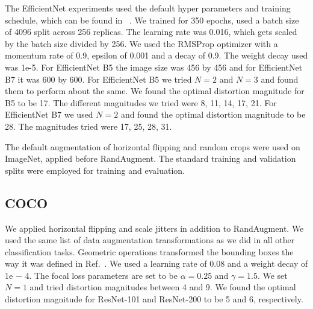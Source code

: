 The EfficientNet experiments used the default hyper parameters and training schedule, which can be found in ~\cite{tan2019efficientnet}. We trained for 350 epochs, used a batch size of 4096 split across 256 replicas. The learning rate was 0.016, which gets scaled by the batch size divided by 256. We used the RMSProp optimizer with a momentum rate of 0.9, epsilon of 0.001 and a decay of 0.9. The weight decay used was 1e-5. For EfficientNet B5 the image size was 456 by 456 and for EfficientNet B7 it was 600 by 600. For EfficientNet B5 we tried $N=2$ and $N=3$ and found them to perform about the same. We found the optimal distortion magnitude for B5 to be 17. The different magnitudes we tried were 8, 11, 14, 17, 21. For EfficientNet B7 we used $N=2$ and found the optimal distortion magnitude to be 28. The magnitudes tried were 17, 25, 28, 31.

The default augmentation of horizontal flipping and random crops were used on ImageNet, applied before RandAugment. The standard training and validation splits were employed for training and evaluation.

\subsection{COCO}
\label{coco_details}
We applied horizontal flipping and scale jitters in addition to RandAugment. We used the same list of data augmentation transformations as we did in all other classification tasks. Geometric operations transformed the bounding boxes the way it was defined in Ref.~\cite{zoph2019learning}. We used a learning rate of 0.08 and a weight decay of 1e − 4. The focal loss parameters are set to be $\alpha = 0.25$ and $\gamma = 1.5$. We set $N=1$ and tried distortion magnitudes between 4 and 9. We found the optimal distortion magnitude for ResNet-101 and ResNet-200 to be 5 and 6, respectively. 